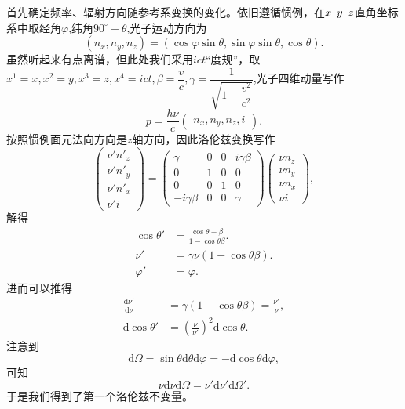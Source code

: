 \documentclass[../天体物理基础.tex]{subfiles}
\begin{document}
首先确定频率、辐射方向随参考系变换的变化。依旧遵循惯例，在$x\text{\textendash}y\text{\textendash}z$直角坐标系中取经角$\varphi$,纬角$90^{\circ}-\theta$,光子运动方向为
\begin{equation}
\left(n_x,n_y,n_z\right)=\left(\cos\varphi\sin\theta,\sin\varphi\sin\theta,\cos\theta\right).
\end{equation}
虽然听起来有点离谱，但此处我们采用$ict$“度规”，取$x^{1}=x,x^{2}=y,x^{3}=z,x^{4}=ict,\beta=\dfrac{v}{c},\gamma=\dfrac{1}{\sqrt{1-\dfrac{v^2}{c^2}}}$,光子四维动量写作
\begin{equation}
p=\frac{h\nu}{c}
\begin{pmatrix}
n_x,n_y,n_z,i
\end{pmatrix}.
\end{equation}
按照惯例面元法向方向是$z$轴方向，因此洛伦兹变换写作
\begin{equation}
\begin{pmatrix}
\nu' n'_z\\\nu' n'_y\\\nu' n'_x\\\nu' i
\end{pmatrix}=
\begin{pmatrix}
\gamma & 0 & 0 & i\gamma\beta\\
0 & 1 & 0 & 0\\
0 & 0 & 1 & 0\\
-i\gamma\beta & 0 & 0 &\gamma
\end{pmatrix}
\begin{pmatrix}
\nu n_z\\\nu n_y\\\nu n_x\\\nu i
\end{pmatrix},
\end{equation}
解得
\begin{align}
\cos\theta'&=\frac{\cos\theta-\beta}{1-\cos\theta\beta}.\\
\nu'&=\gamma\nu\left(1-\cos\theta\beta\right).\\
\varphi'&=\varphi.
\end{align}
进而可以推得
\begin{align}
\frac{\mathrm{d}\nu'}{\mathrm{d}\nu}&=\gamma\left(1-\cos\theta\beta\right)=\frac{\nu'}{\nu},\\
\mathrm{d}\cos\theta'&=\left(\frac{\nu}{\nu'}\right)^2\mathrm{d}\cos\theta.
\end{align}
注意到
\begin{equation}
\mathrm{d}\Omega=\sin\theta\mathrm{d}\theta\mathrm{d}\varphi=-\mathrm{d}\cos\theta\mathrm{d}\varphi,
\end{equation}
可知
\begin{equation}
\nu\mathrm{d}\nu\mathrm{d}\Omega=\nu'\mathrm{d}\nu'\mathrm{d}\Omega'.
\end{equation}
于是我们得到了第一个洛伦兹不变量。
\end{document}
